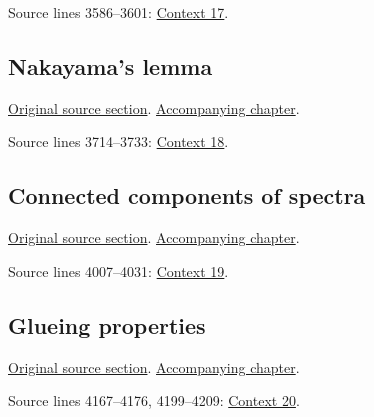 \begin{AlgebraSourceRoutes}
 Source lines 3586--3601: \hyperlink{algebra-context-017}{Context 17}.
\end{AlgebraSourceRoutes}

\subsection{Nakayama's lemma}
\hypertarget{algebra-source-section-nakayama}{}
\noindent\href{https://github.com/stacks/stacks-project/blob/a04446e57ec1fbc252a871afcec7752fb2807b14/algebra.tex\#L3606}{Original source section}. \href{algebra.pdf\#nameddest=section-nakayama}{Accompanying chapter}.

\begin{AlgebraSourceRoutes}
 Source lines 3714--3733: \hyperlink{algebra-context-018}{Context 18}.
\end{AlgebraSourceRoutes}

\subsection{Connected components of spectra}
\hypertarget{algebra-source-section-connected-components}{}
\noindent\href{https://github.com/stacks/stacks-project/blob/a04446e57ec1fbc252a871afcec7752fb2807b14/algebra.tex\#L3958}{Original source section}. \href{algebra.pdf\#nameddest=section-connected-components}{Accompanying chapter}.

\begin{AlgebraSourceRoutes}
 Source lines 4007--4031: \hyperlink{algebra-context-019}{Context 19}.
\end{AlgebraSourceRoutes}

\subsection{Glueing properties}
\hypertarget{algebra-source-section-more-glueing}{}
\noindent\href{https://github.com/stacks/stacks-project/blob/a04446e57ec1fbc252a871afcec7752fb2807b14/algebra.tex\#L4041}{Original source section}. \href{algebra.pdf\#nameddest=section-more-glueing}{Accompanying chapter}.

\begin{AlgebraSourceRoutes}
 Source lines 4167--4176, 4199--4209: \hyperlink{algebra-context-020}{Context 20}.
\end{AlgebraSourceRoutes}

